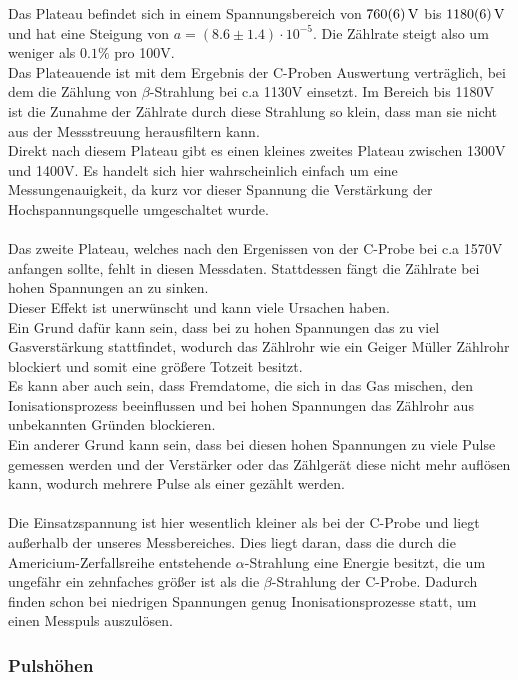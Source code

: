 \documentclass[12pt,a4paper]{article}
\begin{document}
Das Plateau befindet sich in einem Spannungsbereich von $\SI{760\pm 6}{V}$ bis $\SI{1180\pm 6}{V}$ und hat eine Steigung von $a = (8.6\pm1.4)\cdot 10^{-5}$. Die Zählrate steigt also um weniger als $0.1\%$ pro 100V.\\
 Das Plateauende ist mit dem Ergebnis der C-Proben Auswertung verträglich, bei dem die Zählung von $\beta$-Strahlung bei c.a 1130V einsetzt. Im Bereich bis 1180V ist die Zunahme der Zählrate durch diese Strahlung so klein, dass man sie nicht aus der Messstreuung herausfiltern kann.\\
Direkt nach diesem Plateau gibt es einen kleines zweites Plateau zwischen 1300V und 1400V. Es handelt sich hier wahrscheinlich einfach um eine Messungenauigkeit, da kurz vor dieser Spannung die Verstärkung der Hochspannungsquelle umgeschaltet wurde.\\
\\
Das zweite Plateau, welches nach den Ergenissen von der C-Probe bei c.a 1570V anfangen sollte, fehlt in diesen Messdaten. Stattdessen fängt die Zählrate bei hohen Spannungen an zu sinken. \\
Dieser Effekt ist unerwünscht und kann viele Ursachen haben.\\
Ein Grund dafür kann sein, dass bei zu hohen Spannungen das zu viel Gasverstärkung stattfindet, wodurch das Zählrohr wie ein Geiger Müller Zählrohr blockiert und somit eine größere Totzeit besitzt.\\
Es kann aber auch sein, dass Fremdatome, die sich in das Gas mischen, den Ionisationsprozess beeinflussen und bei hohen Spannungen das Zählrohr aus unbekannten Gründen blockieren.\\
Ein anderer Grund kann sein, dass bei diesen hohen Spannungen zu viele Pulse gemessen werden und der Verstärker oder das Zählgerät diese nicht mehr auflösen kann, wodurch mehrere Pulse als einer gezählt werden.\\
\\
Die Einsatzspannung ist hier wesentlich kleiner als bei der C-Probe und liegt außerhalb der unseres Messbereiches. Dies liegt daran, dass die durch die Americium-Zerfallsreihe entstehende $\alpha$-Strahlung eine Energie besitzt, die 
um ungefähr ein zehnfaches größer ist als die $\beta$-Strahlung der C-Probe. Dadurch finden schon bei niedrigen Spannungen genug Inonisationsprozesse statt, um einen Messpuls auszulösen.\\


\subsubsection{Pulshöhen}
\end{document}
